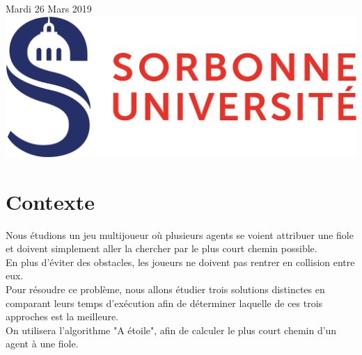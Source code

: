 \documentclass{article}
\begin{document}
\begin{titlepage}

{\large Mardi 26 Mars 2019}\\[3cm] %


    \includegraphics[scale=0.15]{logo_sorbonne.png} %
 

\vfill %

\end{titlepage}

\newpage
\renewcommand{\contentsname}{\center{Table des Matières}\vspace*{5cm}}

\tableofcontents

\newpage


\section{Contexte}
	Nous étudions un jeu multijoueur où plusieurs agents se voient attribuer une fiole et doivent simplement aller la chercher par le plus court chemin possible.\\
En plus d'éviter des obstacles, les joueurs ne doivent pas rentrer en collision entre eux. \\
Pour résoudre ce problème, nous allons étudier trois solutions distinctes en comparant leurs temps d'exécution afin de déterminer laquelle de ces trois approches est la meilleure.\\
On utilisera l'algorithme "A étoile", afin de calculer le plus court chemin d'un agent à une fiole.
\end{document}
